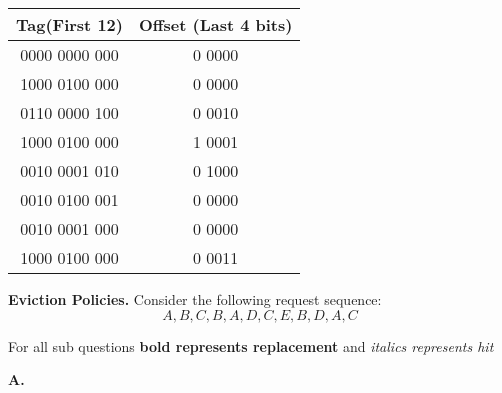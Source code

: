 \documentclass{exam}
\begin{document}
\begin{questions}
\begin{tabular}{c c}
\textbf{Tag(First 12)}&\textbf{Offset (Last 4 bits)}\\ [0.5ex]
\hline \hline
0000 0000 000 &0 0000\\
1000 0100 000 &0 0000\\
0110 0000 100 & 0 0010\\
1000 0100 000 & 1 0001\\
0010 0001 010 & 0 1000\\
0010 0100 001 & 0 0000\\
0010 0001 000 & 0 0000\\
1000 0100 000 & 0 0011\\
\end{tabular}

\question[20]
\textbf{Eviction Policies.}
Consider the following request sequence:
$$ A, B, C, B, A, D, C, E, B, D, A, C $$

\end{questions}

For all sub questions \textbf{bold represents replacement} and \textit{italics represents hit}

\textbf{A.}
\end{document}
